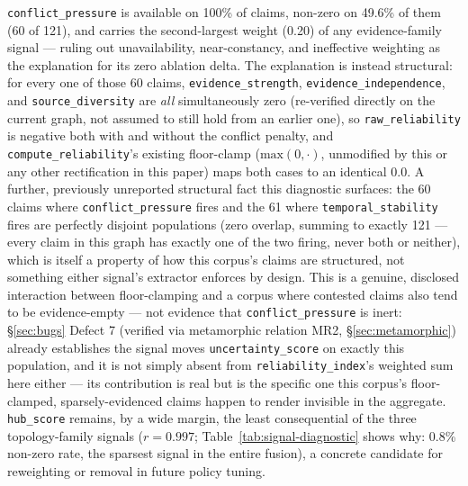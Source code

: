 \texttt{conflict\_pressure} is available on 100\% of claims, non-zero on
49.6\% of them (60 of 121), and carries the second-largest weight (0.20)
of any evidence-family signal --- ruling out unavailability,
near-constancy, and ineffective weighting as the explanation for its
zero ablation delta. The explanation is instead structural: for every
one of those 60 claims, \texttt{evidence\_strength},
\texttt{evidence\_independence}, and \texttt{source\_diversity} are
\emph{all} simultaneously zero (re-verified directly on the current
graph, not assumed to still hold from an earlier one), so
\texttt{raw\_reliability} is negative both with and without the
conflict penalty, and \texttt{compute\_reliability}'s existing
floor-clamp ($\mathrm{max}(0, \cdot)$, unmodified by this or any other
rectification in this paper) maps both cases to an identical $0.0$. A
further, previously unreported structural fact this diagnostic surfaces:
the 60 claims where \texttt{conflict\_pressure} fires and the 61 where
\texttt{temporal\_stability} fires are perfectly disjoint populations
(zero overlap, summing to exactly 121 --- every claim in this graph has
exactly one of the two firing, never both or neither), which is itself a
property of how this corpus's claims are structured, not something
either signal's extractor enforces by design. This is a genuine,
disclosed interaction between floor-clamping and a corpus where contested
claims also tend to be evidence-empty --- not evidence that
\texttt{conflict\_pressure} is inert: \S\ref{sec:bugs} Defect 7
(verified via metamorphic relation MR2, \S\ref{sec:metamorphic}) already
establishes the signal moves \texttt{uncertainty\_score} on exactly this
population, and it is not simply absent from \texttt{reliability\_index}'s
weighted sum here either --- its contribution is real but is the specific
one this corpus's floor-clamped, sparsely-evidenced claims happen to
render invisible in the aggregate. \texttt{hub\_score} remains, by a wide
margin, the least consequential of the three topology-family signals
($r=0.997$; Table~\ref{tab:signal-diagnostic} shows why: 0.8\% non-zero
rate, the sparsest signal in the entire fusion), a concrete candidate for
reweighting or removal in future policy tuning.
